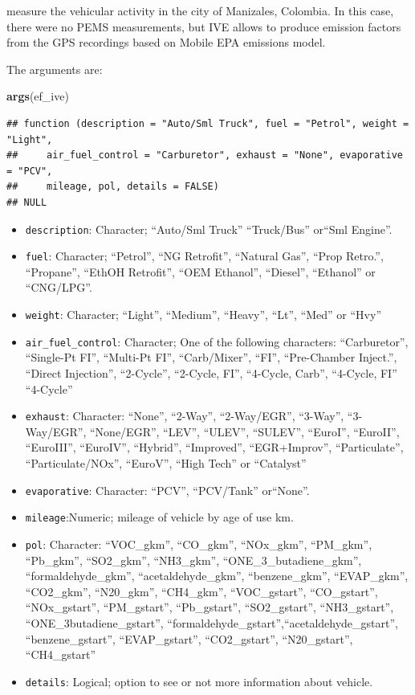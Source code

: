 \documentclass[12pt,graybox,envcountchap,sectrefs]{krantz}
\makeatletter
\newenvironment{Shaded}{\begin{snugshade}}{\end{snugshade}}
\newcommand{\KeywordTok}[1]{\textcolor[rgb]{0.13,0.29,0.53}{\textbf{#1}}}
\newcommand{\NormalTok}[1]{#1}
\providecommand{\tightlist}{%
  \setlength{\itemsep}{0pt}\setlength{\parskip}{0pt}}
\newenvironment{kframe}{%
\medskip{}
\setlength{\fboxsep}{.8em}
 \def\at@end@of@kframe{}%
 \ifinner\ifhmode%
  \def\at@end@of@kframe{\end{minipage}}%
  \begin{minipage}{\columnwidth}%
 \fi\fi%
 \def\FrameCommand##1{\hskip\@totalleftmargin \hskip-\fboxsep
 \colorbox{shadecolor}{##1}\hskip-\fboxsep
     \hskip-\linewidth \hskip-\@totalleftmargin \hskip\columnwidth}%
 \MakeFramed {\advance\hsize-\width
   \@totalleftmargin\z@ \linewidth\hsize
   \@setminipage}}%
 {\par\unskip\endMakeFramed%
 \at@end@of@kframe}
\renewenvironment{Shaded}{\begin{kframe}}{\end{kframe}}
\theoremstyle{definition}
\theoremstyle{definition}
\theoremstyle{definition}
\theoremstyle{remark}
\makeatother
\begin{document}
\citet{gonzalez2017relative} measure the vehicular activity in the city
of Manizales, Colombia. In this case, there were no PEMS measurements,
but IVE allows to produce emission factors from the GPS recordings based
on Mobile EPA emissions
model\citep[\citet{Davisetal2005}]{arbor2003user}.

The arguments are:

\begin{Shaded}
\begin{Highlighting}[]
\KeywordTok{args}\NormalTok{(ef_ive)}
\end{Highlighting}
\end{Shaded}

\begin{verbatim}
## function (description = "Auto/Sml Truck", fuel = "Petrol", weight = "Light", 
##     air_fuel_control = "Carburetor", exhaust = "None", evaporative = "PCV", 
##     mileage, pol, details = FALSE) 
## NULL
\end{verbatim}

\begin{itemize}
\tightlist
\item
  \texttt{description}: Character; ``Auto/Sml Truck'' ``Truck/Bus''
  or``Sml Engine''.
\item
  \texttt{fuel}: Character; ``Petrol'', ``NG Retrofit'', ``Natural
  Gas'', ``Prop Retro.'', ``Propane'', ``EthOH Retrofit'', ``OEM
  Ethanol'', ``Diesel'', ``Ethanol'' or ``CNG/LPG''.
\item
  \texttt{weight}: Character; ``Light'', ``Medium'', ``Heavy'', ``Lt'',
  ``Med'' or ``Hvy''
\item
  \texttt{air\_fuel\_control}: Character; One of the following
  characters: ``Carburetor'', ``Single-Pt FI'', ``Multi-Pt FI'',
  ``Carb/Mixer'', ``FI'', ``Pre-Chamber Inject.'', ``Direct Injection'',
  ``2-Cycle'', ``2-Cycle, FI'', ``4-Cycle, Carb'', ``4-Cycle, FI''
  ``4-Cycle''
\item
  \texttt{exhaust}: Character: ``None'', ``2-Way'', ``2-Way/EGR'',
  ``3-Way'', ``3-Way/EGR'', ``None/EGR'', ``LEV'', ``ULEV'', ``SULEV'',
  ``EuroI'', ``EuroII'', ``EuroIII'', ``EuroIV'', ``Hybrid'',
  ``Improved'', ``EGR+Improv'', ``Particulate'', ``Particulate/NOx'',
  ``EuroV'', ``High Tech'' or ``Catalyst''
\item
  \texttt{evaporative}: Character: ``PCV'', ``PCV/Tank'' or``None''.
\item
  \texttt{mileage}:Numeric; mileage of vehicle by age of use km.
\item
  \texttt{pol}: Character: ``VOC\_gkm'', ``CO\_gkm'', ``NOx\_gkm'',
  ``PM\_gkm'', ``Pb\_gkm'', ``SO2\_gkm'', ``NH3\_gkm'',
  ``ONE\_3\_butadiene\_gkm'', ``formaldehyde\_gkm'',
  ``acetaldehyde\_gkm'', ``benzene\_gkm'', ``EVAP\_gkm'', ``CO2\_gkm'',
  ``N20\_gkm'', ``CH4\_gkm'', ``VOC\_gstart'', ``CO\_gstart'',
  ``NOx\_gstart'', ``PM\_gstart'', ``Pb\_gstart'', ``SO2\_gstart'',
  ``NH3\_gstart'', ``ONE\_3butadiene\_gstart'',
  ``formaldehyde\_gstart'',``acetaldehyde\_gstart'',
  ``benzene\_gstart'', ``EVAP\_gstart'', ``CO2\_gstart'',
  ``N20\_gstart'', ``CH4\_gstart''
\item
  \texttt{details}: Logical; option to see or not more information about
  vehicle.
\end{itemize}
\end{document}
